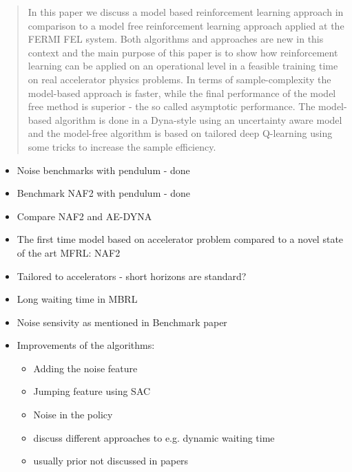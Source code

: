 \documentclass[
 reprint,
 amsmath,amssymb,amsfonts,clevref,
 aps,
prstab,
]{revtex4-2}
\begin{document}
\begin{abstract}
In this paper we discuss a model based reinforcement learning approach in comparison to a model free reinforcement learning approach applied at the FERMI FEL system. Both algorithms and approaches are new in this context and the main purpose of this paper is to show how reinforcement learning can be applied on an operational level in a feasible training time on real accelerator physics problems. In terms of sample-complexity the model-based approach is faster, while the final performance of the model free method is superior - the so called asymptotic performance. The model-based algorithm is done in a Dyna-style using an uncertainty aware model and the model-free algorithm is based on tailored deep Q-learning using some tricks to increase the sample efficiency.

\end{abstract}
\maketitle
\begin{itemize}
	\item Noise benchmarks with pendulum - done
	\item Benchmark NAF2 with pendulum - done
	\item Compare NAF2 and AE-DYNA
	\item The first time model based on accelerator problem compared to a novel state of the art MFRL: NAF2
	\item Tailored to accelerators - short horizons are standard?
	\item Long waiting time in MBRL
	\item Noise sensivity as mentioned in Benchmark paper
	\item Improvements of the algorithms:
	\begin{itemize}
		\item Adding the noise feature
		\item Jumping feature using SAC
		\item Noise in the policy
		\item discuss different approaches to e.g. dynamic waiting time
		\item usually prior not discussed in papers
	\end{itemize}
\end{itemize}
\end{document}
